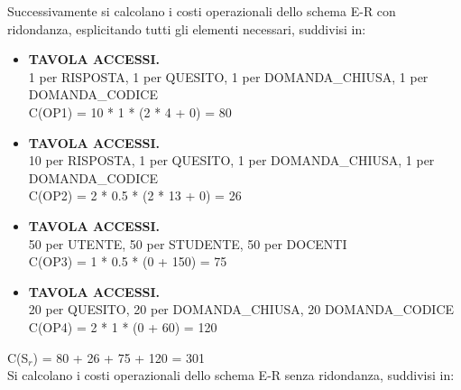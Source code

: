 \documentclass{article}
\begin{document}
Successivamente si calcolano i costi operazionali dello schema E-R con ridondanza, esplicitando tutti gli elementi necessari, suddivisi in:
\begin{itemize}[label={ }]
    \itemsep0em 
    \item {\small\textbf{TAVOLA ACCESSI.} \\ 1 per RISPOSTA, 1 per QUESITO, 1 per DOMANDA\_CHIUSA, 1 per DOMANDA\_CODICE} \vspace*{2pt}\\ C(OP1) = 10 * 1 * (2 * 4 + 0) = 80 \vspace*{2pt} 
    \item {\small\textbf{TAVOLA ACCESSI.} \\ 10 per RISPOSTA, 1 per QUESITO, 1 per DOMANDA\_CHIUSA, 1 per DOMANDA\_CODICE} \vspace*{2pt}\\ C(OP2) = 2 * 0.5 * (2 * 13 + 0) = 26 \vspace*{2pt}
    \item {\small\textbf{TAVOLA ACCESSI.} \\ 50 per UTENTE, 50 per STUDENTE, 50 per DOCENTI} \vspace*{2pt}\\ C(OP3) = 1 * 0.5 * (0 + 150) = 75
    \item {\small\textbf{TAVOLA ACCESSI.} \\ 20 per QUESITO, 20 per DOMANDA\_CHIUSA, 20 DOMANDA\_CODICE } \vspace*{1pt}\\ C(OP4) = 2 * 1 * (0 + 60) = 120
\end{itemize}
\hspace*{15pt}C(S$_r$) = 80 + 26 + 75 + 120 = 301 \vspace*{7pt}\\
Si calcolano i costi operazionali dello schema E-R senza ridondanza, suddivisi in:
\end{document}
